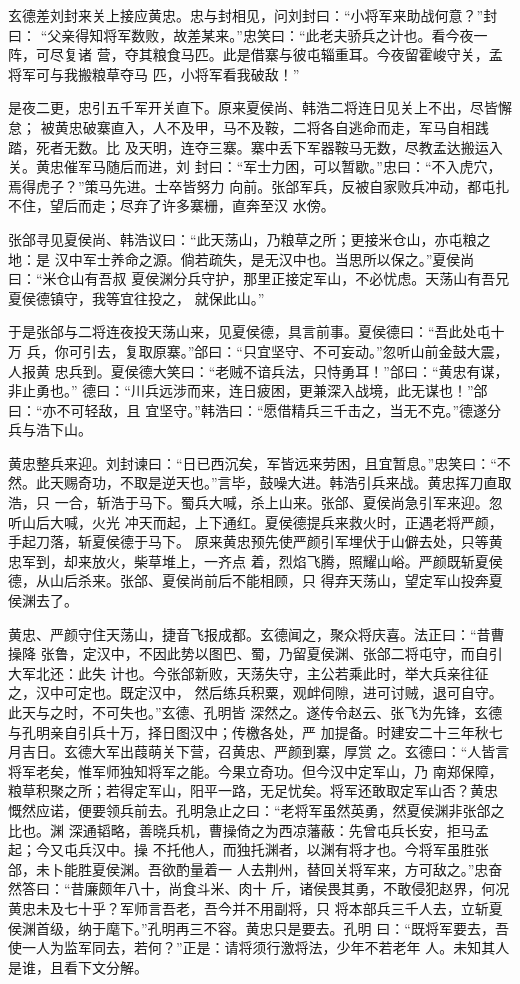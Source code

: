 玄德差刘封来关上接应黄忠。忠与封相见，问刘封曰：“小将军来助战何意？”封曰：
“父亲得知将军数败，故差某来。”忠笑曰：“此老夫骄兵之计也。看今夜一阵，可尽复诸
营，夺其粮食马匹。此是借寨与彼屯辎重耳。今夜留霍峻守关，孟将军可与我搬粮草夺马
匹，小将军看我破敌！”

是夜二更，忠引五千军开关直下。原来夏侯尚、韩浩二将连日见关上不出，尽皆懈怠；
被黄忠破寨直入，人不及甲，马不及鞍，二将各自逃命而走，军马自相践踏，死者无数。比
及天明，连夺三寨。寨中丢下军器鞍马无数，尽教孟达搬运入关。黄忠催军马随后而进，刘
封曰：“军士力困，可以暂歇。”忠曰：“不入虎穴，焉得虎子？”策马先进。士卒皆努力
向前。张郃军兵，反被自家败兵冲动，都屯扎不住，望后而走；尽弃了许多寨栅，直奔至汉
水傍。

张郃寻见夏侯尚、韩浩议曰：“此天荡山，乃粮草之所；更接米仓山，亦屯粮之地：是
汉中军士养命之源。倘若疏失，是无汉中也。当思所以保之。”夏侯尚曰：“米仓山有吾叔
夏侯渊分兵守护，那里正接定军山，不必忧虑。天荡山有吾兄夏侯德镇守，我等宜往投之，
就保此山。”

于是张郃与二将连夜投天荡山来，见夏侯德，具言前事。夏侯德曰：“吾此处屯十万
兵，你可引去，复取原寨。”郃曰：“只宜坚守、不可妄动。”忽听山前金鼓大震，人报黄
忠兵到。夏侯德大笑曰：“老贼不谙兵法，只恃勇耳！”郃曰：“黄忠有谋，非止勇也。”
德曰：“川兵远涉而来，连日疲困，更兼深入战境，此无谋也！”郃曰：“亦不可轻敌，且
宜坚守。”韩浩曰：“愿借精兵三千击之，当无不克。”德遂分兵与浩下山。

黄忠整兵来迎。刘封谏曰：“日已西沉矣，军皆远来劳困，且宜暂息。”忠笑曰：“不
然。此天赐奇功，不取是逆天也。”言毕，鼓噪大进。韩浩引兵来战。黄忠挥刀直取浩，只
一合，斩浩于马下。蜀兵大喊，杀上山来。张郃、夏侯尚急引军来迎。忽听山后大喊，火光
冲天而起，上下通红。夏侯德提兵来救火时，正遇老将严颜，手起刀落，斩夏侯德于马下。
原来黄忠预先使严颜引军埋伏于山僻去处，只等黄忠军到，却来放火，柴草堆上，一齐点
着，烈焰飞腾，照耀山峪。严颜既斩夏侯德，从山后杀来。张郃、夏侯尚前后不能相顾，只
得弃天荡山，望定军山投奔夏侯渊去了。

黄忠、严颜守住天荡山，捷音飞报成都。玄德闻之，聚众将庆喜。法正曰：“昔曹操降
张鲁，定汉中，不因此势以图巴、蜀，乃留夏侯渊、张郃二将屯守，而自引大军北还：此失
计也。今张郃新败，天荡失守，主公若乘此时，举大兵亲往征之，汉中可定也。既定汉中，
然后练兵积粟，观衅伺隙，进可讨贼，退可自守。此天与之时，不可失也。”玄德、孔明皆
深然之。遂传令赵云、张飞为先锋，玄德与孔明亲自引兵十万，择日图汉中；传檄各处，严
加提备。时建安二十三年秋七月吉日。玄德大军出葭萌关下营，召黄忠、严颜到寨，厚赏
之。玄德曰：“人皆言将军老矣，惟军师独知将军之能。今果立奇功。但今汉中定军山，乃
南郑保障，粮草积聚之所；若得定军山，阳平一路，无足忧矣。将军还敢取定军山否？黄忠
慨然应诺，便要领兵前去。孔明急止之曰：“老将军虽然英勇，然夏侯渊非张郃之比也。渊
深通韬略，善晓兵机，曹操倚之为西凉藩蔽：先曾屯兵长安，拒马孟起；今又屯兵汉中。操
不托他人，而独托渊者，以渊有将才也。今将军虽胜张郃，未卜能胜夏侯渊。吾欲酌量着一
人去荆州，替回关将军来，方可敌之。”忠奋然答曰：“昔廉颇年八十，尚食斗米、肉十
斤，诸侯畏其勇，不敢侵犯赵界，何况黄忠未及七十乎？军师言吾老，吾今并不用副将，只
将本部兵三千人去，立斩夏侯渊首级，纳于麾下。”孔明再三不容。黄忠只是要去。孔明
曰：“既将军要去，吾使一人为监军同去，若何？”正是：请将须行激将法，少年不若老年
人。未知其人是谁，且看下文分解。